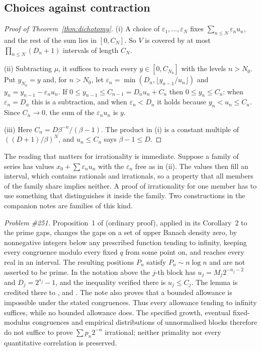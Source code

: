 \documentclass[11pt]{article}
\begin{document}
\subsection{Choices against contraction}\label{sec:dichotomy}

\begin{proof}[Proof of Theorem~\ref{thm:dichotomy}]
(i) A choice of $\varepsilon_1,\dots,\varepsilon_N$ fixes
$\sum_{n\le N}\varepsilon_nu_n$, and the rest of the sum lies in $[0,C_N]$.
So $V$ is covered by at most $\prod_{n\le N}(D_n+1)$ intervals of length $C_N$.

(ii) Subtracting $\mu$, it suffices to reach every $y\in[0,C_{N_0}]$ with the
levels $n>N_0$.  Put $y_{N_0}=y$ and, for $n>N_0$, let
$\varepsilon_n=\min(D_n,\lfloor y_{n-1}/u_n\rfloor)$ and
$y_n=y_{n-1}-\varepsilon_nu_n$.  If $0\le y_{n-1}\le C_{n-1}=D_nu_n+C_n$ then
$0\le y_n\le C_n$: when $\varepsilon_n=D_n$ this is a subtraction, and when
$\varepsilon_n<D_n$ it holds because $y_n<u_n\le C_n$.  Since $C_n\to0$, the
sum of the $\varepsilon_nu_n$ is $y$.

(iii) Here $C_n=D\beta^{-n}/(\beta-1)$.  The product in (i) is a constant
multiple of $((D+1)/\beta)^N$, and $u_n\le C_n$ says $\beta-1\le D$.
\end{proof}

The reading that matters for irrationality is immediate.  Suppose a family of
series has values $x_0+\sum\varepsilon_nu_n$ with the $\varepsilon_n$ free as in
(ii).  The values then fill an interval, which contains rationals and
irrationals, so a property that all members of the family share implies
neither.  A proof of irrationality for one member has to use something that
distinguishes it inside the family.  Two constructions in the companion notes
are families of this kind.

\emph{Problem \#251.}  Proposition~1 of \cite{plectis251} (ordinary proof),
applied in its Corollary~2 to the prime gaps, changes the gaps on a set of upper
Banach density zero, by nonnegative integers below any prescribed function
tending to infinity, keeping every congruence modulo every fixed $q$ from some
point on, and reaches every real in an interval.  The resulting positions
$P_n$ satisfy $P_n\sim n\log n$ and are not asserted to be prime.  In the notation above the $j$-th block has $u_j=M_j2^{-n_j-2}$ and
$D_j=2^{s_j}-1$, and the inequality verified there is $u_j\le C_j$.  The
lemma is credited there to \cite{fridy1966}, \cite[Lemma~4]{crmarickovac2025}
and \cite[Lemma~5.1]{kovactao2024}.  The note also proves that a bounded
allowance is impossible under the stated congruences.  Thus every allowance
tending to infinity suffices, while no bounded allowance does.  The specified
growth, eventual fixed-modulus congruences and empirical distributions of
unnormalised blocks therefore do not suffice to prove
$\sum p_n2^{-n}$ irrational; neither primality nor every quantitative
correlation is preserved.
\end{document}
